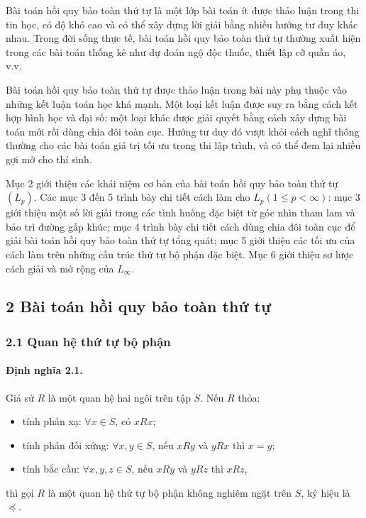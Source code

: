 \documentclass[11pt]{article}
\begin{document}
Bài toán hồi quy bảo toàn thứ tự là một lớp bài toán ít được thảo luận trong
thi tin học, có độ khó cao và có thể xây dựng lời giải bằng nhiều hướng tư duy
khác nhau. Trong đời sống thực tế, bài toán hồi quy bảo toàn thứ tự thường xuất
hiện trong các bài toán thống kê như dự đoán ngộ độc thuốc, thiết lập cỡ quần
áo, v.v.

Bài toán hồi quy bảo toàn thứ tự được thảo luận trong bài này phụ thuộc vào
những kết luận toán học khá mạnh. Một loại kết luận được suy ra bằng cách kết
hợp hình học và đại số; một loại khác được giải quyết bằng cách xây dựng bài
toán mới rồi dùng chia đôi toàn cục. Hướng tư duy đó vượt khỏi cách nghĩ thông
thường cho các bài toán giá trị tối ưu trong thi lập trình, và có thể đem lại
nhiều gợi mở cho thí sinh.

Mục 2 giới thiệu các khái niệm cơ bản của bài toán hồi quy bảo toàn thứ tự
\((L_p)\). Các mục 3 đến 5 trình bày chi tiết cách làm cho
\(L_p(1\le p<\infty)\): mục 3 giới thiệu một số lời giải trong các tình huống
đặc biệt từ góc nhìn tham lam và bảo trì đường gấp khúc; mục 4 trình bày chi
tiết cách dùng chia đôi toàn cục để giải bài toán hồi quy bảo toàn thứ tự tổng
quát; mục 5 giới thiệu các tối ưu của cách làm trên những cấu trúc thứ tự bộ
phận đặc biệt. Mục 6 giới thiệu sơ lược cách giải và mở rộng của \(L_\infty\).

\subsection*{2 Bài toán hồi quy bảo toàn thứ tự}

\subsubsection*{2.1 Quan hệ thứ tự bộ phận}

\paragraph{Định nghĩa 2.1.}
Giả sử \(R\) là một quan hệ hai ngôi trên tập \(S\). Nếu \(R\) thỏa:
\begin{itemize}
  \item tính phản xạ: \(\forall x\in S\), có \(xRx\);
  \item tính phản đối xứng: \(\forall x,y\in S\), nếu \(xRy\) và \(yRx\) thì
  \(x=y\);
  \item tính bắc cầu: \(\forall x,y,z\in S\), nếu \(xRy\) và \(yRz\) thì
  \(xRz\),
\end{itemize}
thì gọi \(R\) là một quan hệ thứ tự bộ phận không nghiêm ngặt trên \(S\), ký
hiệu là \(\preceq\).
\end{document}
